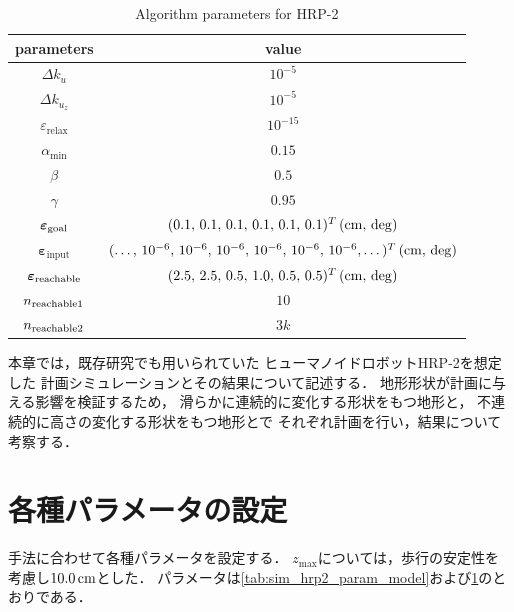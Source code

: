 \documentclass[autodetect-engine,dvipdfmx-if-dvi,ja=standard,a4j,jbase=11pt,magstyle=nomag*]{bxjsreport}
\begin{document}
\begin{table}[pt]%
    \renewcommand{\arraystretch}{0.9}
    \centering
    \caption{Algorithm parameters for HRP-2}
    \label{tab:sim_hrp2_param_algorithm}
    \begin{tabular}{cc}
        \toprule
        parameters                          &   value \\
        \midrule
        $\Delta k_u$                        &   $10^{-5}$ \\
        $\Delta k_{u_z}$                    &   $10^{-5}$ \\
        $\varepsilon_\mathrm{relax}$        &   $10^{-15}$ \\
        $\alpha_\mathrm{min}$               &   $0.15$ \\
        $\beta$                             &   $0.5$ \\
        $\gamma$                            &   $0.95$ \\
        $\bm{\varepsilon}_{\mathrm{goal}}$          &   $(0.1 ,\, 0.1 ,\, 0.1 ,\, 0.1 ,\, 0.1 ,\, 0.1)^T\,(\si{\centi\meter} ,\, \mathrm{deg})$ \\
        $\bm{\varepsilon}_{\mathrm{input}}$ &   $(\dots ,\, 10^{-6} ,\, 10^{-6} ,\, 10^{-6} ,\, 10^{-6} ,\, 10^{-6} ,\, 10^{-6} , \dots)^T\,(\si{\centi\meter} ,\, \mathrm{deg})$ \\
        $\bm{\varepsilon}_{\mathrm{reachable}}$     &   $(2.5 ,\, 2.5 ,\, 0.5 ,\, 1.0 ,\, 0.5 ,\, 0.5)^T\,(\si{\centi\meter} ,\, \mathrm{deg})$ \\
        $n_{\mathrm{reachable}1}$                   &   $10$ \\
        $n_{\mathrm{reachable}2}$                   &   $3k$ \\
        \bottomrule
    \end{tabular}
    \renewcommand{\arraystretch}{1.0}
\end{table}

本章では，既存研究\cite{yao_2011rs}でも用いられていた
ヒューマノイドロボットHRP-2\cite{isozumi_2004jrsj}を想定した
計画シミュレーションとその結果について記述する．
地形形状が計画に与える影響を検証するため，
滑らかに連続的に変化する形状をもつ地形と，
不連続的に高さの変化する形状をもつ地形とで
それぞれ計画を行い，結果について考察する．



\section{各種パラメータの設定}
手法\cite{yao_2011rs}に合わせて各種パラメータを設定する．
$z_{\mathrm{max}}$については，歩行の安定性を考慮し$10.0\,\si{\centi\meter}$とした．
パラメータは\cref{tab:sim_hrp2_param_model}および\cref{tab:sim_hrp2_param_algorithm}のとおりである．
\end{document}
